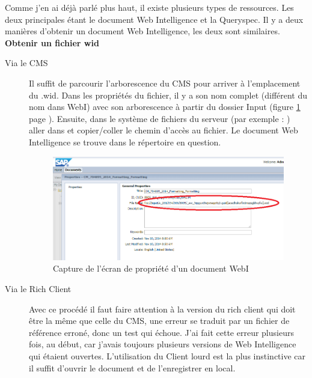Comme j'en ai d\'{e}j\`{a} parl\'{e} plus haut, il existe plusieurs types de ressources. Les deux principales \'{e}tant le document Web Intelligence et la \gls{Queryspec}.
Il y a deux mani\`{e}res d'obtenir un document Web Intelligence, les deux sont similaires.\\
\textbf{Obtenir un fichier wid}
\begin{description}
	\item	[Via le CMS] 
	\begin{sloppypar}
	Il suffit de parcourir l'arborescence du CMS pour arriver \`{a} l'emplacement du .wid. Dans les propri\'{e}t\'{e}s du fichier, il y a son nom complet (diff\'{e}rent du nom dans WebI) avec son arborescence \`{a} partir du dossier Input (figure \ref{figure:widFileLocation} page \pageref{figure:widFileLocation} ). Ensuite, dans le syst\`{e}me de fichiers du serveur (par exemple : ) aller dans 
	 et copier/coller le chemin d'acc\`{e}s au fichier. Le document Web Intelligence se trouve dans le r\'{e}pertoire en question.
	\end{sloppypar}
\begin{figure}[!ht]
  \centering
      \includegraphics[width=\textwidth]{images/widFileLocation.png}
  \caption{Capture de l'\'{e}cran de propri\'{e}t\'{e} d'un document WebI}
	\label{figure:widFileLocation}
\end{figure}
	\item[Via le Rich Client]
	Avec ce proc\'{e}d\'{e} il faut faire attention \`{a} la version du rich client qui doit \^{e}tre la m\^{e}me que celle du CMS, une erreur se traduit par un fichier de r\'{e}f\'{e}rence erron\'{e}, donc un test qui \'{e}choue. J'ai fait cette erreur plusieurs fois, au d\'{e}but, car j'avais toujours plusieurs versions de Web Intelligence qui \'{e}taient ouvertes. L'utilisation du \gls{Client lourd} est la plus instinctive car il suffit d'ouvrir le document et de l'enregistrer en local.
\end{description}
